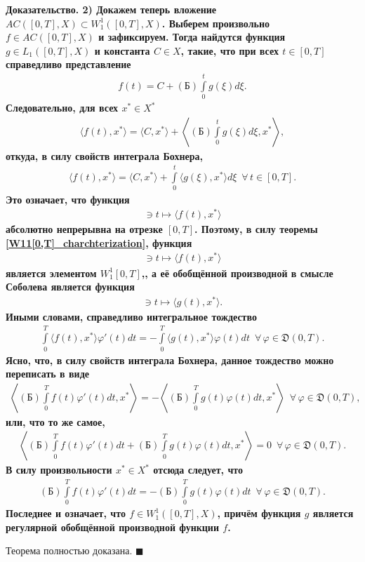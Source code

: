 \documentclass{report}
\newenvironment{Proof}{\par\noindent\bf Доказательство.\rm}{ $\blacksquare$\par}
\begin{document}
\begin{Proof}
2) Докажем теперь вложение $AC([0,T],X)\subset W^1_1([0,T],X)$. Выберем произвольно $f\in AC([0,T],X)$ и зафиксируем. Тогда
найдутся функция $g\in L_1([0,T],X)$ и константа $C\in X$, такие, что при всех $t\in[0,T]$ справедливо представление
\begin{gather*}
f(t)=C+(\textrm{Б})\int\limits_0^tg(\xi)d\xi.
\end{gather*}
Следовательно, для всех $x^*\in X^*$
\begin{gather*}
\langle f(t),x^*\rangle=\langle C,x^*\rangle+\left\langle(\textrm{Б})\int\limits_0^tg(\xi)d\xi,x^*\right\rangle,
\end{gather*}
откуда, в силу свойств интеграла Бохнера,
\begin{gather*}
\langle f(t),x^*\rangle=\langle C,x^*\rangle+\int\limits_0^t\langle g(\xi),x^*\rangle d\xi\,\,\,\forall\,t\in[0,T].
\end{gather*}
Это означает, что функция
\begin{gather*}
[0,T]\ni t\mapsto\langle f(t),x^*\rangle
\end{gather*}
абсолютно непрерывна на отрезке $[0,T]$. Поэтому, в силу теоремы \ref{W11[0,T]_charchterization}, функция
\begin{gather*}
[0,T]\ni t\mapsto\langle f(t),x^*\rangle
\end{gather*}
является элементом $W^1_1[0,T]$,, а её обобщённой производной в смысле Соболева является функция
\begin{gather*}
[0,T]\ni t\mapsto\langle g(t),x^*\rangle.
\end{gather*}
Иными словами, справедливо интегральное тождество
\begin{gather*}
\int\limits_0^T\langle f(t),x^*\rangle\varphi'(t)dt=-\int\limits_0^T\langle g(t),x^*\rangle\varphi(t)dt\,\,\,\forall\,\varphi\in
\mathfrak{D}(0,T).
\end{gather*}
Ясно, что, в силу свойств интеграла Бохнера, данное тождество можно переписать в виде
\begin{gather*}
\left\langle (\textrm{Б})\int\limits_0^Tf(t)\varphi'(t)dt,x^*\right\rangle=-
\left\langle (\textrm{Б})\int\limits_0^Tg(t)\varphi(t)dt,x^*\right\rangle\,\,\,\forall\,\varphi\in \mathfrak{D}(0,T),
\end{gather*}
или, что то же самое,
\begin{gather*}
\left\langle (\textrm{Б})\int\limits_0^Tf(t)\varphi'(t)dt+(\textrm{Б})\int\limits_0^Tg(t)\varphi(t)dt,x^*\right\rangle=0\,\,\,\forall\,\varphi\in \mathfrak{D}(0,T).
\end{gather*}
В силу произвольности $x^*\in X^*$ отсюда следует, что
\begin{gather*}
(\textrm{Б})\int\limits_0^Tf(t)\varphi'(t)dt=-(\textrm{Б})\int\limits_0^Tg(t)\varphi(t)dt\,\,\,\forall\,\varphi\in\mathfrak{D}(0,T).
\end{gather*}
Последнее и означает, что $f\in W^1_1([0,T],X)$, причём функция $g$ является регулярной обобщённой производной функции $f$.

Теорема полностью доказана.
\end{Proof}
\end{document}
